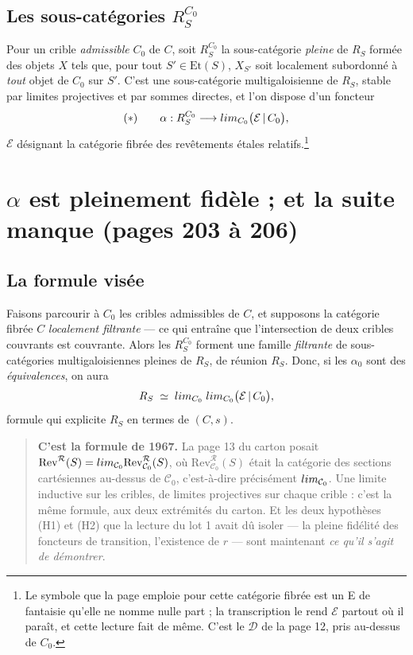 \documentclass[11pt,a4paper]{article}
\begin{document}
\subsection*{Les sous-catégories $R_{S}^{C_{0}}$}

Pour un crible \emph{admissible} $C_{0}$ de $C$, soit $R_{S}^{C_{0}}$ la
sous-catégorie \emph{pleine} de $R_{S}$ formée des objets $X$ tels que, pour
tout $S' \in \mathrm{Et}(S)$, $X_{S'}$ soit localement subordonné à \emph{tout}
objet de $C_{0}$ sur $S'$. C'est une sous-catégorie multigaloisienne de
$R_{S}$, stable par limites projectives et par sommes directes, et l'on
dispose d'un foncteur
\[
  (\ast) \qquad
  \alpha : R_{S}^{C_{0}} \longrightarrow
  \varprojlim_{C_{0}} \bigl(\mathcal{E}\,|\,C_{0}\bigr) ,
\]
$\mathcal{E}$ désignant la catégorie fibrée des revêtements étales
relatifs.\footnote{Le symbole que la page emploie pour cette catégorie fibrée
est un E de fantaisie qu'elle ne nomme nulle part ; la transcription le rend
$\mathcal{E}$ partout où il paraît, et cette lecture fait de même. C'est le
$\mathcal{D}$ de la page 12, pris au-dessus de $C_{0}$.}

\section*{$\alpha$ est pleinement fidèle ; et la suite manque (pages 203 à 206)}

\subsection*{La formule visée}

Faisons parcourir à $C_{0}$ les cribles admissibles de $C$, et supposons la
catégorie fibrée $C$ \emph{localement filtrante} --- ce qui entraîne que
l'intersection de deux cribles couvrants est couvrante. Alors les
$R_{S}^{C_{0}}$ forment une famille \emph{filtrante} de sous-catégories
multigaloisiennes pleines de $R_{S}$, de réunion $R_{S}$. Donc, si les
$\alpha_{0}$ sont des \emph{équivalences}, on aura
\[
  R_{S} \;\simeq\; \varinjlim_{C_{0}} \; \varprojlim_{C_{0}}
  \bigl(\mathcal{E}\,|\,C_{0}\bigr) ,
\]
formule qui explicite $R_{S}$ en termes de $(C, s)$.

\begin{quote}
\textbf{C'est la formule de 1967.} La page 13 du carton posait
$\mathrm{Rev}^{\mathcal{R}}(S) = \varinjlim_{\mathcal{C}_{0}}
\mathrm{Rev}^{\mathcal{R}}_{\mathcal{C}_{0}}(S)$, où
$\mathrm{Rev}^{\mathcal{R}}_{\mathcal{C}_{0}}(S)$ était la catégorie des
sections cartésiennes au-dessus de $\mathcal{C}_{0}$, c'est-à-dire précisément
$\varprojlim_{\mathcal{C}_{0}}$. Une limite inductive sur les cribles, de
limites projectives sur chaque crible : c'est la même formule, aux deux
extrémités du carton. Et les deux hypothèses (H1) et (H2) que la lecture du lot
1 avait dû isoler --- la pleine fidélité des foncteurs de transition,
l'existence de $r$ --- sont maintenant \emph{ce qu'il s'agit de démontrer}.
\end{quote}
\end{document}
